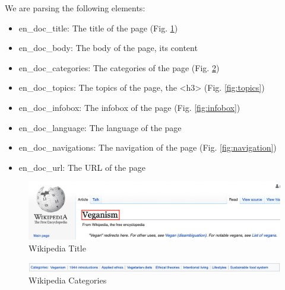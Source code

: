 \documentclass[a4paper]{article}
\begin{document}
We are parsing the following elements:
\begin{itemize}
\item en\_doc\_title: The title of the page (Fig. \ref{fig:title})
\item en\_doc\_body: The body of the page, its content
\item en\_doc\_categories: The categories of the page (Fig. \ref{fig:categories})
\item en\_doc\_topics: The topics of the page, the <h3> (Fig. \ref{fig:topics})
\item en\_doc\_infobox: The infobox of the page (Fig. \ref{fig:infobox})
\item en\_doc\_language: The language of the page
\item en\_doc\_navigations: The navigation of the page (Fig. \ref{fig:navigation})
\item en\_doc\_url: The URL of the page
\end{itemize}


\begin{figure}[H]
	\includegraphics[width=\linewidth]{imgs/title}
	\caption{Wikipedia Title}
	\label{fig:title}
\end{figure}

\begin{figure}[H]
	\includegraphics[scale=0.5]{imgs/categories}
	\caption{Wikipedia Categories}
	\label{fig:categories}
\end{figure}
\end{document}
